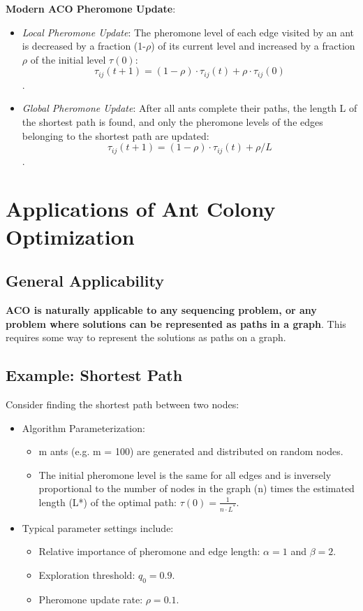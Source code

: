 \textbf{Modern ACO Pheromone Update}:
\begin{itemize}
    \item \textit{Local Pheromone Update}: The pheromone level of each edge visited by an ant is decreased by a fraction (1-$\rho$) of its current level and increased by a fraction $\rho$ of the initial level $\tau(0)$:
    $$
    \tau_{ij}(t+1)=(1-\rho)\cdot\tau_{ij}(t)+\rho\cdot\tau_{ij}(0)
    $$.
    \item \textit{Global Pheromone Update}: After all ants complete their paths, the length L of the shortest path is found, and only the pheromone levels of the edges belonging to the shortest path are updated:
    $$
        \tau_{ij}(t+1)=(1-\rho)\cdot\tau_{ij}(t)+\rho/L
        $$.
\end{itemize}

\section{Applications of Ant Colony Optimization}
\subsection*{General Applicability}
\textbf{ACO is naturally applicable to any sequencing problem, or any problem where solutions can be represented as paths in a graph}. This requires some way to represent the solutions as paths on a graph.

\subsection*{Example: Shortest Path}
Consider finding the shortest path between two nodes:
\begin{itemize}
    \item Algorithm Parameterization:
    \begin{itemize}
        \item  m ants (e.g. m = 100) are generated and distributed on random nodes.
        \item  The initial pheromone level is the same for all edges and is inversely proportional to the number of nodes in the graph (n) times the estimated length (L*) of the optimal path: $\tau(0) = \frac{1}{n \cdot L^*}$.
    \end{itemize}
     \item Typical parameter settings include:
    \begin{itemize}
        \item Relative importance of pheromone and edge length: $\alpha = 1$ and $\beta = 2$.
        \item Exploration threshold: $q_0= 0.9$.
        \item Pheromone update rate: $\rho = 0.1$.
    \end{itemize}
\end{itemize}
